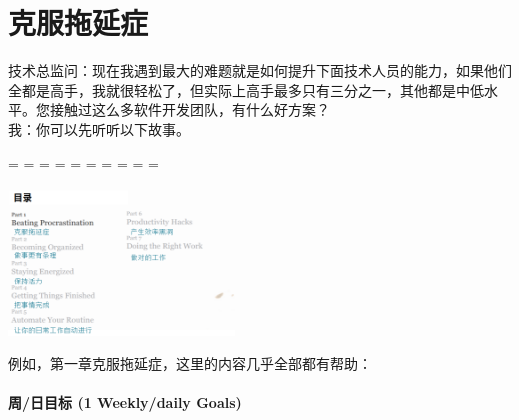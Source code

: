 \chapter{克服拖延症} %


技术总监问：现在我遇到最大的难题就是如何提升下面技术人员的能力，如果他们全都是高手，我就很轻松了，但实际上高手最多只有三分之一，其他都是中低水平。您接触过这么多软件开发团队，有什么好方案？\\
我：你可以先听听以下故事。\\

\begin{description}
\tightlist
\item[]
= = = = = = = = = =
\end{description}




\includegraphics[width=6cm]{Screenshotfrom2023-10-1523-05-00.png}

例如，第一章克服拖延症，这里的内容几乎全部都有帮助：\\



\hypertarget{ux6839ux56e0ux5206ux6790ux8befux89e3ux6848ux4f8b}{%
\subsubsection{周/日目标 (1 Weekly/daily Goals)}\label{ux6839ux56e0ux5206ux6790ux8befux89e3ux6848ux4f8b}}


